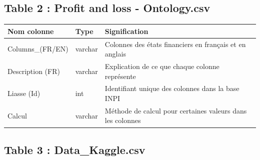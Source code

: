 \documentclass[mstat,12pt]{unswthesis}
\begin{document}
\subsection{Table 2 : Profit and loss -
Ontology.csv}\label{table-2-profit-and-loss---ontology.csv}

\begin{table}[H]
\centering
\scriptsize
\begin{tabular}{|p{4cm}|p{2cm}|p{9cm}|}
\hline
\textbf{Nom colonne} & \textbf{Type} & \textbf{Signification} \\
\hline
Columns\_(FR/EN) & varchar & Colonnes des états financiers en français et en anglais \\
\hline
Description (FR) & varchar & Explication de ce que chaque colonne représente \\
\hline
Liasse (Id) & int & Identifiant unique des colonnes dans la base INPI \\
\hline
Calcul & varchar & Méthode de calcul pour certaines valeurs dans les colonnes \\
\hline
\end{tabular}
\normalsize
\end{table}

\subsection{Table 3 : Data\_Kaggle.csv}\label{table-3-data_kaggle.csv}
\end{document}
